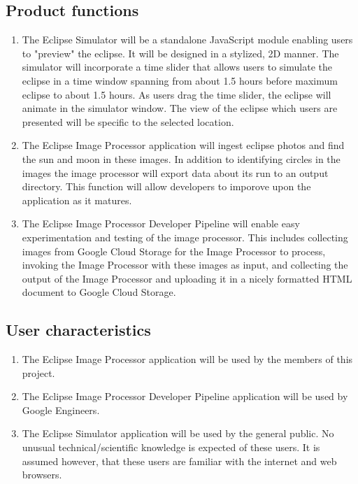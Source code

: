 \documentclass[10pt, onecolumn, draftclsnofoot, letterpaper, compsoc]{IEEEtran}
\begin{document}
\subsection{Product functions}
	\begin{enumerate}
		\item The Eclipse Simulator will be a standalone JavaScript
		module enabling users to "preview" the eclipse. It will be
		designed in a stylized, 2D manner. The simulator will
		incorporate a time slider that allows users to simulate the
		eclipse in a time window spanning from about 1.5 hours before maximum
        eclipse to about 1.5 hours. As users drag the time
		slider, the eclipse will animate in the simulator window.
		The view of the eclipse which users are presented will be
		specific to the selected location.

		\item The Eclipse Image Processor application will ingest eclipse
		photos and find the sun and moon in these images. In addition to
        identifying circles in the images the image processor will export
        data about its run to an output directory. This function will allow
        developers to imporove upon the application as it matures.

		\item The Eclipse Image Processor Developer Pipeline will enable easy
        experimentation and testing of the image processor. This includes
		collecting images from Google Cloud Storage for the Image Processor to process,
		invoking the Image Processor with these images as input, and collecting
		the output of the Image Processor and uploading it in a nicely formatted
        HTML document to Google Cloud Storage. 

	\end{enumerate}

\subsection{User characteristics}
	\begin{enumerate}
		\item The Eclipse Image Processor application will be used by
            the members of this project.

		\item The Eclipse Image Processor Developer Pipeline application will be
            used by Google Engineers.

		\item The Eclipse Simulator application will be used by the
			general public. No unusual technical/scientific knowledge is
			expected of these users. It is assumed however, that these users
			are familiar with the internet and web browsers.
	\end{enumerate}
\end{document}
